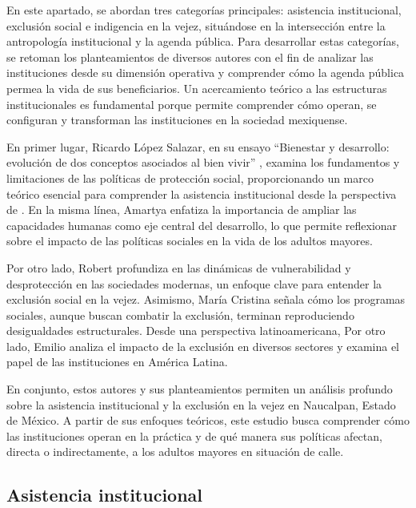 \documentclass[
  spanish,
  11pt,
  a4paper,
]{scrbook}
\begin{document}
En este apartado, se abordan tres categorías principales: asistencia
institucional, exclusión social e indigencia en la vejez, situándose en
la intersección entre la antropología institucional y la agenda pública.
Para desarrollar estas categorías, se retoman los planteamientos de
diversos autores con el fin de analizar las instituciones desde su
dimensión operativa y comprender cómo la agenda pública permea la vida
de sus beneficiarios. Un acercamiento teórico a las estructuras
institucionales es fundamental porque permite comprender cómo operan, se
configuran y transforman las instituciones en la sociedad mexiquense.

En primer lugar, Ricardo López Salazar, en su ensayo ``Bienestar y
desarrollo: evolución de dos conceptos asociados al bien vivir''
\autocite{Lopez2019}, examina los fundamentos y limitaciones de las
políticas de protección social, proporcionando un marco teórico esencial
para comprender la asistencia institucional desde la perspectiva de
\textcite{Titmuss1981}. En la misma línea, Amartya \textcite{Sen2000}
enfatiza la importancia de ampliar las capacidades humanas como eje
central del desarrollo, lo que permite reflexionar sobre el impacto de
las políticas sociales en la vida de los adultos mayores.

Por otro lado, Robert \textcite{Castel2004} profundiza en las dinámicas
de vulnerabilidad y desprotección en las sociedades modernas, un enfoque
clave para entender la exclusión social en la vejez. Asimismo, María
Cristina \textcite{Bayon2013} señala cómo los programas sociales, aunque
buscan combatir la exclusión, terminan reproduciendo desigualdades
estructurales. Desde una perspectiva latinoamericana, Por otro lado,
Emilio \textcite{TentiFanfani1989} analiza el impacto de la exclusión en
diversos sectores y examina el papel de las instituciones en América
Latina.

En conjunto, estos autores y sus planteamientos permiten un análisis
profundo sobre la asistencia institucional y la exclusión en la vejez en
Naucalpan, Estado de México. A partir de sus enfoques teóricos, este
estudio busca comprender cómo las instituciones operan en la práctica y
de qué manera sus políticas afectan, directa o indirectamente, a los
adultos mayores en situación de calle.

\subsection*{Asistencia institucional}\label{asistencia-institucional}
\end{document}
